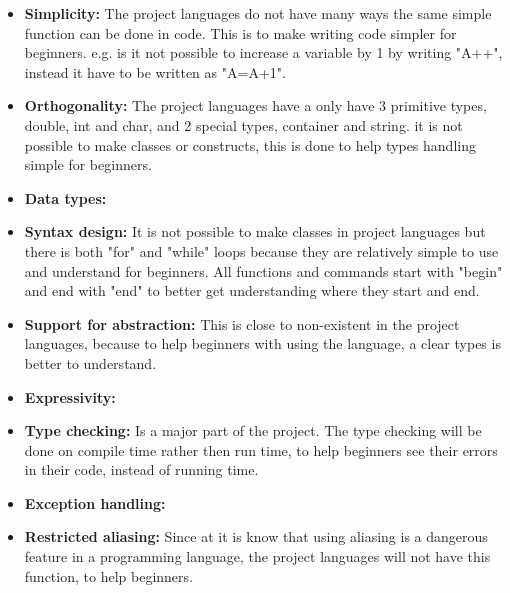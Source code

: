 \begin{itemize}
\item \textbf{Simplicity:} The project languages do not have many ways the same simple function can be done in code. This is to make writing code simpler for beginners.  e.g. is it not possible to increase a variable by 1 by writing "A++", instead it have to be written as "A=A+1".

\item \textbf{Orthogonality:} The project languages have a only have 3 primitive types, double, int and char, and 2 special types, container and string. it is not possible to make classes or constructs, this is done to help types handling simple for beginners.

\item \textbf{Data types:} 

\item \textbf{Syntax design:} It is not possible to make classes in project languages but there is both "for" and "while" loops because they are relatively simple to use and understand for beginners. All functions and commands start with "begin" and end with "end" to better get understanding where they start and end.

\item \textbf{Support for abstraction:} This is close to non-existent in the project languages, because to help beginners with using the language, a clear types is better to understand.

\item \textbf{Expressivity:} 

\item \textbf{Type checking:} Is a major part of the project. The type checking will be done on compile time rather then run time, to help beginners see their errors in their code, instead of running time.

\item \textbf{Exception handling:} 

\item \textbf{Restricted aliasing:} Since at it is know that using aliasing is a dangerous feature in a programming language, the project languages will not have this function, to help beginners.
\end{itemize}
